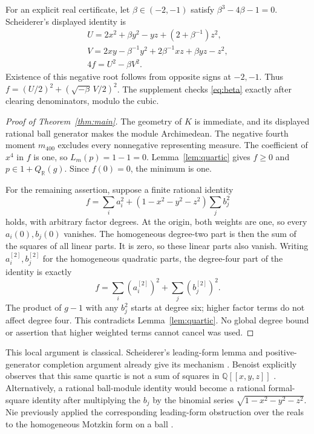 \documentclass[11pt]{article}
\newcommand{\Q}{\mathbb Q}
\newcommand{\R}{\mathbb R}
\begin{document}
For an explicit real certificate, let \(\beta\in(-2,-1)\) satisfy
\(\beta^3-4\beta-1=0\). Scheiderer's displayed identity is
\begin{equation}\label{eq:beta}
\begin{gathered}
 U=2x^2+\beta y^2-yz+(2+\beta^{-1})z^2,\\
 V=2xy-\beta^{-1}y^2+2\beta^{-1}xz+\beta yz-z^2,\\
 4f=U^2-\beta V^2.
\end{gathered}
\end{equation}
Existence of this negative root follows from opposite signs at \(-2,-1\).
Thus \(f=(U/2)^2+(\sqrt{-\beta}\,V/2)^2\).
The supplement checks \eqref{eq:beta} exactly after clearing denominators,
modulo the cubic.

\begin{proof}[Proof of Theorem~\ref{thm:main}]
The geometry of \(K\) is immediate, and its displayed rational ball
generator makes the module Archimedean.
The negative fourth moment \(m_{400}\) excludes every nonnegative
representing measure. The coefficient of \(x^4\) in \(f\) is one, so
\(L_m(p)=1-1=0\).
Lemma~\ref{lem:quartic} gives \(f\geq0\) and
\(p\in1+Q_{\R}(g)\). Since \(f(0)=0\), the minimum is one.

For the remaining assertion, suppose a finite rational identity
\[
 f=\sum_i a_i^2+(1-x^2-y^2-z^2)\sum_j b_j^2
\]
holds, with arbitrary factor degrees.
At the origin, both weights are one, so every \(a_i(0),b_j(0)\) vanishes.
The homogeneous degree-two part is then the sum of the squares of all
linear parts. It is zero, so these linear parts also vanish.
Writing \(a_i^{[2]},b_j^{[2]}\) for the homogeneous quadratic parts,
the degree-four part of the identity is exactly
\[
 f=\sum_i (a_i^{[2]})^2+\sum_j(b_j^{[2]})^2.
\]
The product of \(g-1\) with any \(b_j^2\) starts at degree six;
higher factor terms do not affect degree four. This contradicts
Lemma~\ref{lem:quartic}. No global degree bound or assertion that
higher weighted terms cannot cancel was used.
\end{proof}

This local argument is classical. Scheiderer's leading-form lemma and
positive-generator completion argument already give its mechanism
\cite[Lemma~1.1 and proof of Proposition~6.1]{Sch00}.
Benoist explicitly observes that this same quartic is not a sum of
squares in \(\Q[[x,y,z]]\) \cite[Remark~2.7]{Benoist}.
Alternatively, a rational ball-module identity would become a rational
formal-square identity after multiplying the \(b_j\) by the binomial
series \(\sqrt{1-x^2-y^2-z^2}\).
Nie previously applied the corresponding leading-form obstruction over
the reals to the homogeneous Motzkin form on a ball
\cite[Example~5.3]{Nie}.
\end{document}

